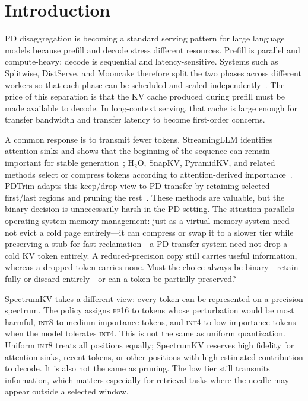 \documentclass[11pt]{article}
\newcommand{\method}{SpectrumKV}
\newcommand{\fp}{\textsc{fp16}}
\newcommand{\intviii}{\textsc{int8}}
\newcommand{\intiv}{\textsc{int4}}
\theoremstyle{plain}
\theoremstyle{definition}
\begin{document}
\section{Introduction}
\label{sec:intro}

PD disaggregation is becoming a standard serving pattern for large language models because prefill and decode stress different resources.  Prefill is parallel and compute-heavy; decode is sequential and latency-sensitive.  Systems such as Splitwise, DistServe, and Mooncake therefore split the two phases across different workers so that each phase can be scheduled and scaled independently~\citep{splitwise,distserve,mooncake}.  The price of this separation is that the KV cache produced during prefill must be made available to decode.  In long-context serving, that cache is large enough for transfer bandwidth and transfer latency to become first-order concerns.

A common response is to transmit fewer tokens.  StreamingLLM identifies attention sinks and shows that the beginning of the sequence can remain important for stable generation~\citep{streamingllm}; H$_2$O, SnapKV, PyramidKV, and related methods select or compress tokens according to attention-derived importance~\citep{h2o,snapkv,pyramidkv,dynamickv}.  PDTrim adapts this keep/drop view to PD transfer by retaining selected first/last regions and pruning the rest~\citep{pdtrim}.  These methods are valuable, but the binary decision is unnecessarily harsh in the PD setting.  The situation parallels operating-system memory management: just as a virtual memory system need not evict a cold page entirely---it can compress or swap it to a slower tier while preserving a stub for fast reclamation---a PD transfer system need not drop a cold KV token entirely.  A reduced-precision copy still carries useful information, whereas a dropped token carries none.  Must the choice always be binary---retain fully or discard entirely---or can a token be partially preserved?

\method{} takes a different view: every token can be represented on a precision spectrum.  The policy assigns \fp{} to tokens whose perturbation would be most harmful, \intviii{} to medium-importance tokens, and \intiv{} to low-importance tokens when the model tolerates \intiv{}.  This is not the same as uniform quantization.  Uniform \intviii{} treats all positions equally; \method{} reserves high fidelity for attention sinks, recent tokens, or other positions with high estimated contribution to decode.  It is also not the same as pruning.  The low tier still transmits information, which matters especially for retrieval tasks where the needle may appear outside a selected window.
\end{document}
